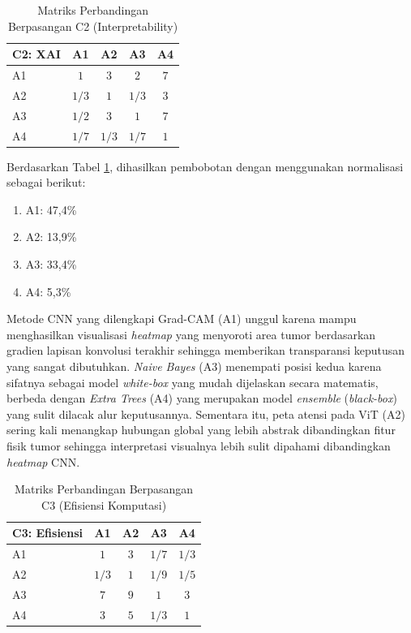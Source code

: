 \begin{enumerate}
	\begin{table}[H]
		\centering
		\caption{Matriks Perbandingan Berpasangan C2 (Interpretability)}
		\label{tab:perbandingan_c2}
		\begin{tabular}{|l|c|c|c|c|}
			\hline
			C2: XAI & A1 & A2 & A3 & A4 \\ \hline
			A1 & $1$ & $3$ & $2$ & $7$ \\ \hline
			A2 & $1/3$ & $1$ & $1/3$ & $3$ \\ \hline
			A3 & $1/2$ & $3$ & $1$ & $7$ \\ \hline
			A4 & $1/7$ & $1/3$ & $1/7$ & $1$ \\ \hline
		\end{tabular}
	\end{table}
	
	Berdasarkan Tabel \ref{tab:perbandingan_c2}, dihasilkan pembobotan dengan menggunakan normalisasi sebagai berikut:
	\begin{enumerate}
		\item A1: 47,4\%
		\item A2: 13,9\%
		\item A3: 33,4\%
		\item A4: 5,3\%\\
	\end{enumerate}
	
	Metode CNN yang dilengkapi Grad-CAM (A1) unggul karena mampu menghasilkan visualisasi \textit{heatmap} yang menyoroti area tumor berdasarkan gradien lapisan konvolusi terakhir sehingga memberikan transparansi keputusan yang sangat dibutuhkan. \textit{Naive Bayes} (A3) menempati posisi kedua karena sifatnya sebagai model \textit{white-box} yang mudah dijelaskan secara matematis, berbeda dengan \textit{Extra Trees} (A4) yang merupakan model \textit{ensemble} (\textit{black-box}) yang sulit dilacak alur keputusannya. Sementara itu, peta atensi pada ViT (A2) sering kali menangkap hubungan global yang lebih abstrak dibandingkan fitur fisik tumor sehingga interpretasi visualnya lebih sulit dipahami dibandingkan \textit{heatmap} CNN.
	
	\begin{table}[H]
		\centering
		\caption{Matriks Perbandingan Berpasangan C3 (Efisiensi Komputasi)}
		\label{tab:perbandingan_c3}
		\begin{tabular}{|l|c|c|c|c|}
			\hline
			C3: Efisiensi & A1 & A2 & A3 & A4 \\ \hline
			A1 & $1$ & $3$ & $1/7$ & $1/3$ \\ \hline
			A2 & $1/3$ & $1$ & $1/9$ & $1/5$ \\ \hline
			A3 & $7$ & $9$ & $1$ & $3$ \\ \hline
			A4 & $3$ & $5$ & $1/3$ & $1$ \\ \hline
		\end{tabular}
	\end{table}
	

\end{enumerate}
